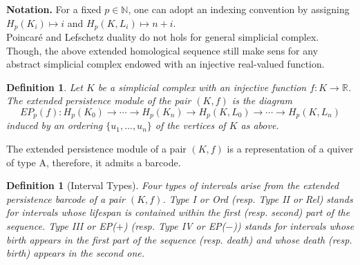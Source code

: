\documentclass[11pt]{article}
\newtheorem{definition}[theorem]{Definition}
\theoremstyle{remark}
\newcommand{\N}{\mathbb{N}}
\newcommand{\R}{\mathbb{R}}
\begin{document}
\noindent \textbf{Notation.} For a fixed $p\in\N$, one can adopt an indexing convention by assigning $H_p(K_i)\mapsto i$ and  $H_p(K,L_i)\mapsto n+i$.\\

\noindent Poincaré and Lefschetz duality do not hols for general simplicial complex. Though, the above extended homological sequence still make sens for any abstract simplicial complex endowed with an injective real-valued function.


\begin{definition}
Let $K$ be a simplicial complex with an injective function $f:K\rightarrow\R$. The extended persistence module of the pair $(K,f)$ is the diagram $$EP_p(f) : H_p(K_0)\rightarrow \cdots \rightarrow H_p(K_n)\rightarrow H_p(K,L_0)\rightarrow \cdots\rightarrow H_p(K,L_n)$$ induced by an ordering $\{u_1,...,u_n\}$ of the vertices of $K$ as above.

\end{definition}

The extended persistence module of a pair $(K,f)$ is a representation of a quiver of type A, therefore, it admits a barcode.





\begin{definition}[Interval Types]
Four types of intervals arise from the extended persistence barcode of a pair $(K,f)$. \textit{Type I} or \textit{Ord} (resp. \textit{Type II} or \textit{Rel}) stands for intervals whose lifespan is contained within the first (resp. second) part of the sequence. \textit{Type III} or \textit{EP}($+$) (resp. \textit{Type IV} or \textit{EP}($-$)) stands for intervals whose birth appears in the first part of the sequence (resp. death) and whose death (resp. birth) appears in the second one. 
\end{definition} 
\end{document}
